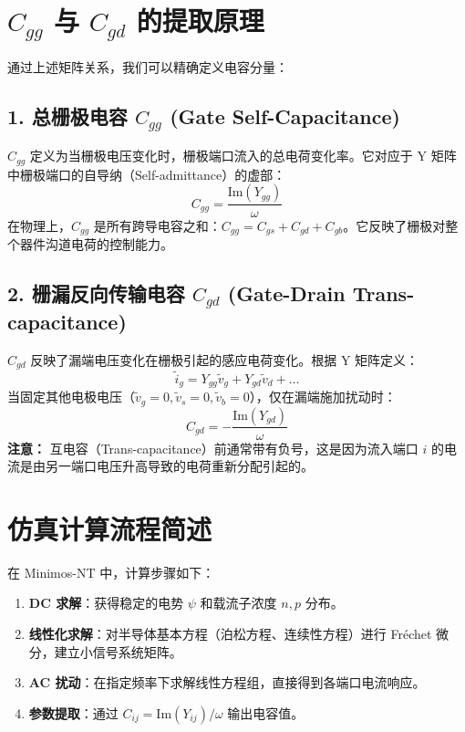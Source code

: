 \documentclass[11pt,a4paper]{article}
\begin{document}
\section{$C_{gg}$ 与 $C_{gd}$ 的提取原理}

通过上述矩阵关系，我们可以精确定义电容分量：

\subsection{1. 总栅极电容 $C_{gg}$ (Gate Self-Capacitance)}
$C_{gg}$ 定义为当栅极电压变化时，栅极端口流入的总电荷变化率。它对应于 Y 矩阵中栅极端口的自导纳（Self-admittance）的虚部：
\begin{equation}
C_{gg} = \frac{\text{Im}(Y_{gg})}{\omega}
\end{equation}
在物理上，$C_{gg}$ 是所有跨导电容之和：$C_{gg} = C_{gs} + C_{gd} + C_{gb}$。它反映了栅极对整个器件沟道电荷的控制能力。

\subsection{2. 栅漏反向传输电容 $C_{gd}$ (Gate-Drain Trans-capacitance)}
$C_{gd}$ 反映了漏端电压变化在栅极引起的感应电荷变化。根据 Y 矩阵定义：
\begin{equation}
\tilde{i}_g = Y_{gg}\tilde{v}_g + Y_{gd}\tilde{v}_d + \dots
\end{equation}
当固定其他电极电压（$\tilde{v}_g=0, \tilde{v}_s=0, \tilde{v}_b=0$），仅在漏端施加扰动时：
\begin{equation}
C_{gd} = - \frac{\text{Im}(Y_{gd})}{\omega}
\end{equation}
\textbf{注意：} 互电容（Trans-capacitance）前通常带有负号，这是因为流入端口 $i$ 的电流是由另一端口电压升高导致的电荷重新分配引起的。

\section{仿真计算流程简述}

在 Minimos-NT 中，计算步骤如下：
\begin{enumerate}
    \item \textbf{DC 求解}：获得稳定的电势 $\psi$ 和载流子浓度 $n, p$ 分布。
    \item \textbf{线性化求解}：对半导体基本方程（泊松方程、连续性方程）进行 Fréchet 微分，建立小信号系统矩阵。
    \item \textbf{AC 扰动}：在指定频率下求解线性方程组，直接得到各端口电流响应。
    \item \textbf{参数提取}：通过 $C_{ij} = \text{Im}(Y_{ij})/\omega$ 输出电容值。
\end{enumerate}
\end{document}
